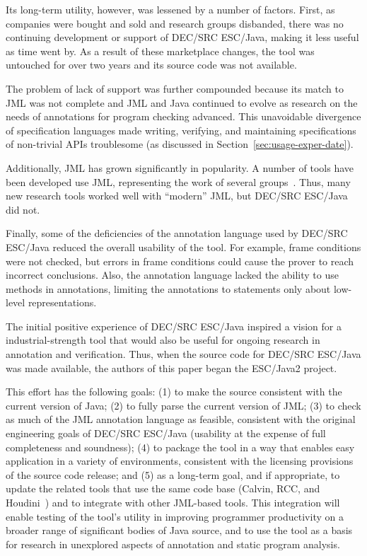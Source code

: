 \documentclass{sig-alternate}
\begin{document}
Its long-term utility, however, was lessened by a number of factors.
First, as companies were bought and sold and research groups
disbanded, there was no continuing development or support of DEC/SRC
ESC/Java, making it less useful as time went by.  As a result of these
marketplace changes, the tool was untouched for over two years and its
source code was not available.  

The problem of lack of support was further compounded because its
match to JML was not complete and JML and Java continued to evolve as
research on the needs of annotations for program checking advanced.
This unavoidable divergence of specification languages made writing,
verifying, and maintaining specifications of non-trivial APIs
troublesome (as discussed in Section~\ref{sec:usage-exper-date}).

Additionally, JML has grown significantly in popularity.  A number of
tools have been developed use JML, representing the work of several
groups~\cite{Burdy-etal03jmlpapers,Bogor03,NimmerErnst01Leavens-etal00}.
Thus, many new research tools worked well with ``modern'' JML, but
DEC/SRC ESC/Java did not.

Finally, some of the deficiencies of the annotation language used by
DEC/SRC ESC/Java reduced the overall usability of the tool.  For
example, frame conditions were not checked, but errors in frame
conditions could cause the prover to reach incorrect conclusions.
Also, the annotation language lacked the ability to use methods in
annotations, limiting the annotations to statements only about
low-level representations.

The initial positive experience of DEC/SRC ESC/Java inspired a vision
for a industrial-strength tool that would also be useful for ongoing
research in annotation and verification.  Thus, when the source code
for DEC/SRC ESC/Java was made available, the authors of this paper
began the ESC/Java2 project.  

This effort has the following goals:
(1) to make the source consistent with the current version of Java;
(2) to fully parse the current version of JML;
(3) to check as much of the JML annotation language as feasible,
consistent with the original engineering goals of DEC/SRC ESC/Java
(usability at the expense of full completeness and soundness); 
(4) to package the tool in a way that enables easy application in a
variety of environments, consistent with the licensing provisions of
the source code release;
and
(5) as a long-term goal, and if appropriate, to update the related
tools that use the same code base (Calvin, RCC, and Houdini~\cite{flanagan01houdini}) and to
integrate with other JML-based tools.  This integration will
enable testing of the tool's utility in improving programmer
productivity on a broader range of significant bodies of Java source,
and to use the tool as a basis for research in unexplored aspects of
annotation and static program analysis.
  
\end{document}

